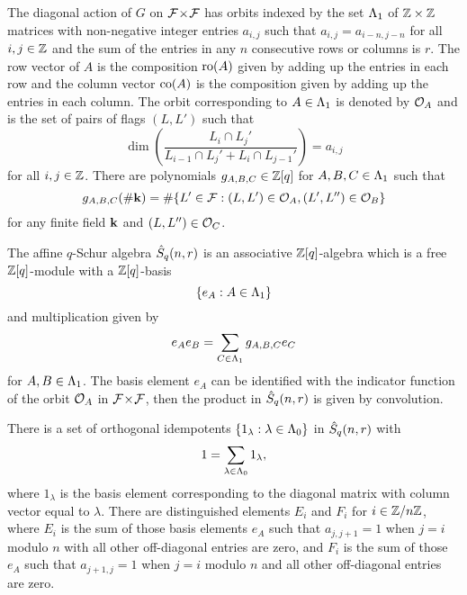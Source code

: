 \documentclass[a4paper, 11pt, twoside]{report}
\begin{document}
The diagonal action of $G$ on ${\mathcal{F}\!\times\!\mathcal{F}}$ has orbits indexed by the set $\Lambda_1{}$ of $\mathbb{Z}\times\mathbb{Z}$ matrices with non-negative integer entries $a_{i,j}$ such that $a_{i,j}=a_{i-n,j-n}$ for all $i,j\in\mathbb{Z}$ and the sum of the entries in any $n$ consecutive rows or columns is $r$. The row vector of $A$ is the composition $\operatorname{ro}(A)$ given by adding up the entries in each row and the column vector $\operatorname{co}(A)$ is the composition given by adding up the entries in each column. The orbit corresponding to $A\in\Lambda_1{}$ is denoted by $\mathcal{O}_{A}$ and is the set of pairs of flags $(L,L')$ such that
\begin{equation*}
\dim\left(\frac{L_i\cap L_j'}{L_{i-1}\cap L_j' + L_i\cap L_{j-1}'}\right) = a_{i,j}
\end{equation*}
for all $i,j\in\mathbb{Z}$. There are polynomials $g_{A,B,C}\in\mathbb{Z}[q]$ for $A,B,C\in\Lambda_1{}$ such that
\begin{equation*}
g_{A,B,C}(\#\mathbf{k}) = \#\{L'\in\mathcal{F}: (L,L')\in\mathcal{O}_{A}, (L',L'')\in\mathcal{O}_{B}\}
\end{equation*}
for any finite field $\mathbf{k}$ and $(L,L'')\in\mathcal{O}_{C}$.

The affine $q$-Schur algebra $\hat{S}_q(n,r)$ is an associative $\mathbb{Z}[q]$-algebra which is a free $\mathbb{Z}[q]$-module with a $\mathbb{Z}[q]$-basis
\begin{equation*}
\{e_A:A\in\Lambda_1{}\}
\end{equation*}
and multiplication given by
\begin{equation*}
e_A e_B = \sum_{C\in\Lambda_1{}} g_{A,B,C}e_C
\end{equation*}
for $A,B\in\Lambda_1{}$. The basis element $e_A$ can be identified with the indicator function of the orbit $\mathcal{O}_{A}$ in ${\mathcal{F}\!\times\!\mathcal{F}}$, then the product in $\hat{S}_q(n,r)$ is given by convolution. 

There is a set of orthogonal idempotents $\{1_\lambda:\lambda\in\Lambda_0{}\}$ in $\hat{S}_q(n,r)$ with
\begin{equation*}
1=\sum_{\lambda\in\Lambda_0{}} 1_\lambda,
\end{equation*}
where $1_\lambda$ is the basis element corresponding to the diagonal matrix with column vector equal to $\lambda$. There are distinguished elements $E_i$ and $F_i$ for $i\in\mathbb{Z}/{n \mathbb{Z}}$, where $E_i$ is the sum of those basis elements $e_A$ such that $a_{j,j+1}=1$ when $j=i$ modulo $n$ with all other off-diagonal entries are zero, and $F_i$ is the sum of those $e_A$ such that $a_{j+1,j}=1$ when $j=i$ modulo $n$ and all other off-diagonal entries are zero.
\end{document}
